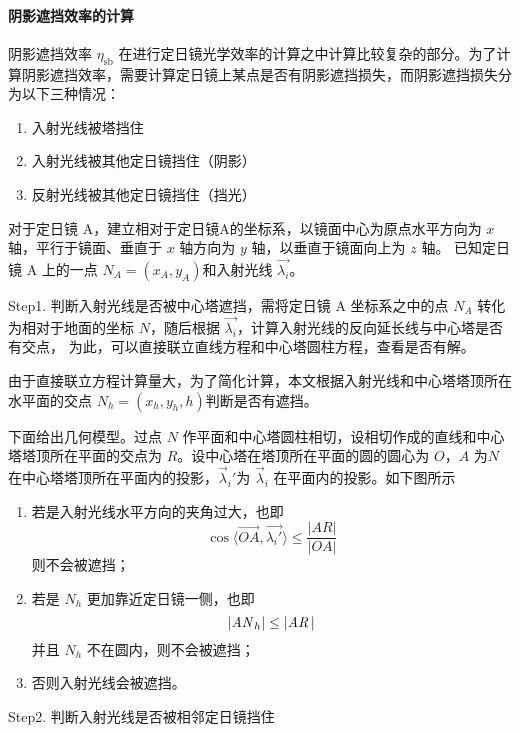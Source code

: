 \documentclass[../main.tex]{subfiles}
\begin{document}
\paragraph{阴影遮挡效率的计算}
阴影遮挡效率 \(\eta _{\mathrm{s b}}\) 在进行定日镜光学效率的计算之中计算比较复杂的部分。为了计算阴影遮挡效率，需要计算定日镜上某点是否有阴影遮挡损失，而阴影遮挡损失分为以下三种情况：
\begin{enumerate}
\item 入射光线被塔挡住
\item 入射光线被其他定日镜挡住（阴影）
\item 反射光线被其他定日镜挡住（挡光）
\end{enumerate}
对于定日镜 A，建立相对于定日镜A的坐标系，以镜面中心为原点水平方向为 \(x\) 轴，平行于镜面、垂直于 \(x\) 轴方向为 \(y\) 轴，以垂直于镜面向上为 \(z\) 轴。
已知定日镜 A 上的一点 \(N_{A} = (x_{A}, y_{A})\)和入射光线 \(\vec {\lambda _{i}}\)。

Step1. 判断入射光线是否被中心塔遮挡，需将定日镜 A 坐标系之中的点 \(N_{A}\) 转化为相对于地面的坐标 \(N\)，随后根据 \(\vec {\lambda _{i}}\)，计算入射光线的反向延长线与中心塔是否有交点，
为此，可以直接联立直线方程和中心塔圆柱方程，查看是否有解。

由于直接联立方程计算量大，为了简化计算，本文根据入射光线和中心塔塔顶所在水平面的交点 \(N_{h} = (x _{h} , y_{h}, h)\)判断是否有遮挡。

下面给出几何模型。过点 \(N\) 作平面和中心塔圆柱相切，设相切作成的直线和中心塔塔顶所在平面的交点为 \(R\)。设中心塔在塔顶所在平面的圆的圆心为 \(O\)，\(A\) 为\(N\)在中心塔塔顶所在平面内的投影，\(\vec \lambda _{i} '\)为 \(\vec \lambda _{i}\) 在平面内的投影。如下图所示

\begin{enumerate}
\item 若是入射光线水平方向的夹角过大，也即
\begin{equation}
\cos \langle \overrightarrow {OA}, \vec {\lambda _{i} '} \rangle \le \frac{\vert AR \vert }{\vert OA \vert }
\end{equation}
则不会被遮挡；
\item 若是 \(N_{h}\) 更加靠近定日镜一侧，也即
\begin{equation}
\vert {\it A N}_{h}\vert \le \vert {\it AR\,} \vert
\end{equation}并且 \(N_{h}\) 不在圆内，则不会被遮挡；
\item 否则入射光线会被遮挡。
\end{enumerate}

Step2. 判断入射光线是否被相邻定日镜挡住
\end{document}
